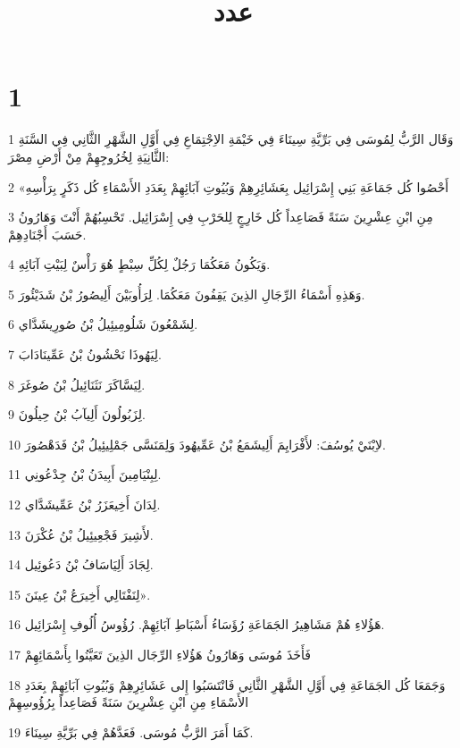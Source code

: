 

\title{عدد}


\chapter{1}

\par 1 وَقَال الرَّبُّ لِمُوسَى فِي بَرِّيَّةِ سِينَاءَ فِي خَيْمَةِ الاِجْتِمَاعِ فِي أَوَّلِ الشَّهْرِ الثَّانِي فِي السَّنَةِ الثَّانِيَةِ لِخُرُوجِهِمْ مِنْ أَرْضِ مِصْرَ:
\par 2 «أَحْصُوا كُل جَمَاعَةِ بَنِي إِسْرَائِيل بِعَشَائِرِهِمْ وَبُيُوتِ آبَائِهِمْ بِعَدَدِ الأَسْمَاءِ كُل ذَكَرٍ بِرَأْسِهِ
\par 3 مِنِ ابْنِ عِشْرِينَ سَنَةً فَصَاعِداً كُل خَارِجٍ لِلحَرْبِ فِي إِسْرَائِيل. تَحْسِبُهُمْ أَنْتَ وَهَارُونُ حَسَبَ أَجْنَادِهِمْ.
\par 4 وَيَكُونُ مَعَكُمَا رَجُلٌ لِكُلِّ سِبْطٍ هُوَ رَأْسٌ لِبَيْتِ آبَائِهِ.
\par 5 وَهَذِهِ أَسْمَاءُ الرِّجَالِ الذِينَ يَقِفُونَ مَعَكُمَا. لِرَأُوبَيْنَ أَلِيصُورُ بْنُ شَدَيْئُورَ.
\par 6 لِشَمْعُونَ شَلُومِيئِيلُ بْنُ صُورِيشَدَّاي.
\par 7 لِيَهُوذَا نَحْشُونُ بْنُ عَمِّينَادَابَ.
\par 8 لِيَسَّاكَرَ نَثَنَائِيلُ بْنُ صُوغَرَ.
\par 9 لِزَبُولُونَ أَلِيآبُ بْنُ حِيلُونَ.
\par 10 لاِبْنَيْ يُوسُفَ: لأَفْرَايِمَ أَلِيشَمَعُ بْنُ عَمِّيهُودَ وَلِمَنَسَّى جَمْلِيئِيلُ بْنُ فَدَهْصُورَ.
\par 11 لِبِنْيَامِينَ أَبِيدَنُ بْنُ جِدْعُونِي.
\par 12 لِدَانَ أَخِيعَزَرُ بْنُ عَمِّيشَدَّاي.
\par 13 لأَشِيرَ فَجْعِيئِيلُ بْنُ عُكْرَنَ.
\par 14 لِجَادَ أَلِيَاسَافُ بْنُ دَعُوئِيل.
\par 15 لِنَفْتَالِي أَخِيرَعُ بْنُ عِينَنَ».
\par 16 هَؤُلاءِ هُمْ مَشَاهِيرُ الجَمَاعَةِ رُؤَسَاءُ أَسْبَاطِ آبَائِهِمْ. رُؤُوسُ أُلُوفِ إِسْرَائِيل.
\par 17 فَأَخَذَ مُوسَى وَهَارُونُ هَؤُلاءِ الرِّجَال الذِينَ تَعَيَّنُوا بِأَسْمَائِهِمْ
\par 18 وَجَمَعَا كُل الجَمَاعَةِ فِي أَوَّلِ الشَّهْرِ الثَّانِي فَانْتَسَبُوا إِلى عَشَائِرِهِمْ وَبُيُوتِ آبَائِهِمْ بِعَدَدِ الأَسْمَاءِ مِنِ ابْنِ عِشْرِينَ سَنَةً فَصَاعِداً بِرُؤُوسِهِمْ
\par 19 كَمَا أَمَرَ الرَّبُّ مُوسَى. فَعَدَّهُمْ فِي بَرِّيَّةِ سِينَاءَ.
